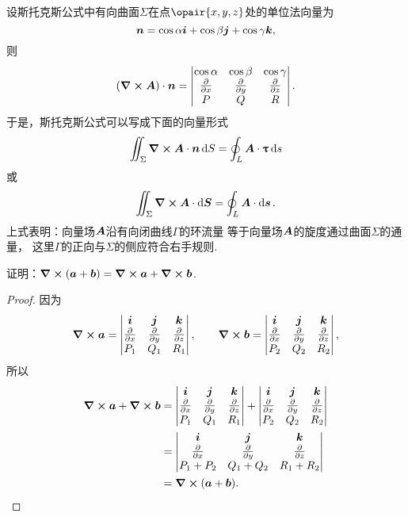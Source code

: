 设斯托克斯公式中有向曲面\(\Sigma\)在点\(\opair{x,y,z}\)处的单位法向量为\[
	\boldsymbol{n} = \cos\alpha \boldsymbol{i} + \cos\beta \boldsymbol{j} + \cos\gamma \boldsymbol{k},
\]
则\[
	(\curl{\boldsymbol{A}}) \cdot \boldsymbol{n} = \begin{vmatrix}
		\cos\alpha & \cos\beta & \cos\gamma \\
		\pdv{x} & \pdv{y} & \pdv{z} \\
		P & Q & R \\
	\end{vmatrix}.
\]
于是，斯托克斯公式可以写成下面的向量形式\[
	\iint_\Sigma \curl{\boldsymbol{A}} \cdot \boldsymbol{n} \dd{S}
	= \oint_L \boldsymbol{A} \cdot \boldsymbol{\uptau} \dd{s}
\]或\[
	\iint_\Sigma \curl{\boldsymbol{A}} \cdot \dd{\boldsymbol{S}}
	= \oint_L \boldsymbol{A} \cdot \dd{\boldsymbol{s}}.
\]
上式表明：向量场\(\boldsymbol{A}\)沿有向闭曲线\(\Gamma\)的环流量
等于向量场\(\boldsymbol{A}\)的旋度通过曲面\(\Sigma\)的通量，
这里\(\Gamma\)的正向与\(\Sigma\)的侧应符合右手规则.

\begin{example}
证明：\(\curl(\boldsymbol{a}+\boldsymbol{b}) = \curl\boldsymbol{a} + \curl\boldsymbol{b}\).
\begin{proof}
因为\[
	\curl\boldsymbol{a} = \begin{vmatrix}
		\boldsymbol{i} & \boldsymbol{j} & \boldsymbol{k} \\
		\pdv{x} & \pdv{y} & \pdv{z} \\
		P_1 & Q_1 & R_1
	\end{vmatrix},
	\qquad
	\curl\boldsymbol{b} = \begin{vmatrix}
		\boldsymbol{i} & \boldsymbol{j} & \boldsymbol{k} \\
		\pdv{x} & \pdv{y} & \pdv{z} \\
		P_2 & Q_2 & R_2
	\end{vmatrix},
\]
所以\begin{align*}
	\curl\boldsymbol{a} + \curl\boldsymbol{b}
	&= \begin{vmatrix}
		\boldsymbol{i} & \boldsymbol{j} & \boldsymbol{k} \\
		\pdv{x} & \pdv{y} & \pdv{z} \\
		P_1 & Q_1 & R_1
	\end{vmatrix} + \begin{vmatrix}
		\boldsymbol{i} & \boldsymbol{j} & \boldsymbol{k} \\
		\pdv{x} & \pdv{y} & \pdv{z} \\
		P_2 & Q_2 & R_2
	\end{vmatrix} \\
	&= \begin{vmatrix}
		\boldsymbol{i} & \boldsymbol{j} & \boldsymbol{k} \\
		\pdv{x} & \pdv{y} & \pdv{z} \\
		P_1 + P_2 & Q_1 + Q_2 & R_1 + R_2
	\end{vmatrix} \\
	&= \curl(\boldsymbol{a}+\boldsymbol{b}). \qedhere
\end{align*}
\end{proof}
\end{example}


